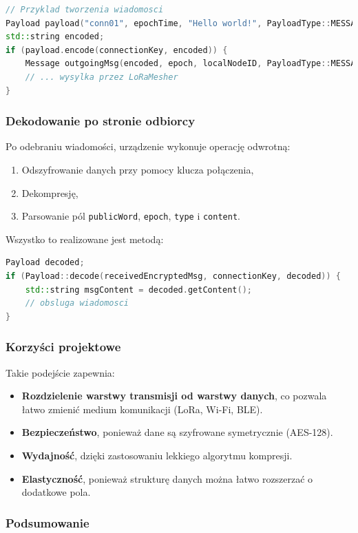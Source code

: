 \begin{lstlisting}[language=C++]
// Przyklad tworzenia wiadomosci
Payload payload("conn01", epochTime, "Hello world!", PayloadType::MESSAGE);
std::string encoded;
if (payload.encode(connectionKey, encoded)) {
    Message outgoingMsg(encoded, epoch, localNodeID, PayloadType::MESSAGE);
    // ... wysylka przez LoRaMesher
}
\end{lstlisting}

\subsubsection{Dekodowanie po stronie odbiorcy}

Po odebraniu wiadomości, urządzenie wykonuje operację odwrotną:
\begin{enumerate}
	\item Odszyfrowanie danych przy pomocy klucza połączenia,
	\item Dekompresję,
	\item Parsowanie pól \texttt{publicWord}, \texttt{epoch}, \texttt{type} i \texttt{content}.
\end{enumerate}
Wszystko to realizowane jest metodą:
\begin{lstlisting}[language=C++]
Payload decoded;
if (Payload::decode(receivedEncryptedMsg, connectionKey, decoded)) {
    std::string msgContent = decoded.getContent();
    // obsluga wiadomosci
}
\end{lstlisting}

\subsubsection{Korzyści projektowe}

Takie podejście zapewnia:
\begin{itemize}
	\item \textbf{Rozdzielenie warstwy transmisji od warstwy danych}, co pozwala łatwo zmienić medium komunikacji (LoRa, Wi-Fi, BLE).
	\item \textbf{Bezpieczeństwo}, ponieważ dane są szyfrowane symetrycznie (AES-128).
	\item \textbf{Wydajność}, dzięki zastosowaniu lekkiego algorytmu kompresji.
	\item \textbf{Elastyczność}, ponieważ strukturę danych można łatwo rozszerzać o dodatkowe pola.
\end{itemize}

\subsubsection{Podsumowanie}

